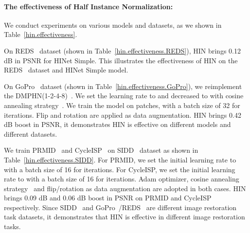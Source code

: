 \documentclass[final]{cvpr}
\begin{document}
\paragraph{The effectiveness of Half Instance Normalization:} 
We conduct experiments on various models and datasets, as we shown in Table~\ref{hin.effectiveness}. 

On REDS~\cite{nah2019ntire} dataset (shown in Table~\ref{hin.effectiveness.REDS}), HIN brings 0.12 dB in PSNR for HINet Simple. 
This illustrates the effectiveness of HIN on the REDS~\cite{nah2019ntire} dataset and HINet Simple model.

On GoPro~\cite{nah2017deep} dataset (shown in Table~\ref{hin.effectiveness.GoPro}), we reimplement the DMPHN(1-2-4-8)~\cite{Zhang_2019_CVPR}. We set the learning rate to  and decreased to  with cosine annealing strategy~\cite{loshchilov2016sgdr}. We train the model on  patches, with a batch size of 32 for  iterations. Flip and rotation are applied as data augmentation. HIN brings 0.42 dB boost in PSNR, it demonstrates HIN is effective on different models and different datasets.

We train PRMID~\cite{wang2020practical} and CycleISP~\cite{Zamir2020CycleISP} on SIDD~\cite{abdelhamed2018high} dataset as shown in Table~\ref{hin.effectiveness.SIDD}. For PRMID, we set the initial learning rate to  with a batch size of 16 for  iterations. For CycleISP, we set the initial learning rate to  with a batch size of 16 for  iterations. Adam optimizer, cosine annealing strategy~\cite{loshchilov2016sgdr} and flip/rotation as data augmentation are adopted in both cases. HIN brings 0.09 dB and 0.06 dB boost in PSNR on PRMID and CycleISP respectively. Since SIDD~\cite{abdelhamed2018high} and GoPro~\cite{nah2017deep}/REDS~\cite{nah2019ntire} are different image restoration task datasets, it demonstrates that HIN is effective in different image restoration tasks.
\end{document}
